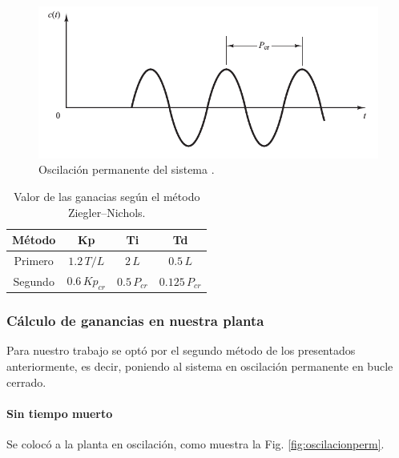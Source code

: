 \begin{figure}[ht]
 \centering
 \includegraphics[scale=0.5]{Cap4-ProgramacionPLC/images/segundometodo.png}
 \caption{Oscilación permanente del sistema \cite{bib:Ogata}.}
 \label{fig:segundometodo}
\end{figure}

\begin{table}[!t]
\renewcommand{\arraystretch}{1.3}
\centering
\begin{tabular}{c||c||c |c}
\hline
\bfseries Método & \bfseries Kp  & \bfseries Ti & \bfseries Td\\
\hline \hline
Primero &  $ 1.2 \, {T}/{L}$ & $2 \, L $ & $ 0.5 \, L $\\
\hline
Segundo &  $0.6 \,Kp_{cr}  $ & $ 0.5 \, P_{cr}$ & $0.125 \, P_{cr} $\\
\hline
\end{tabular}
\caption{Valor de las ganacias según el método Ziegler–Nichols.}
\label{tab:valorganancias}
\end{table}

\subsubsection{Cálculo de ganancias en nuestra planta}

Para nuestro trabajo se optó por el segundo método de los presentados
anteriormente, es decir, poniendo al sistema en oscilación permanente en bucle
cerrado.

\paragraph{Sin tiempo muerto}

Se colocó a la planta en oscilación, como muestra la Fig.
\ref{fig:oscilacionperm}.


